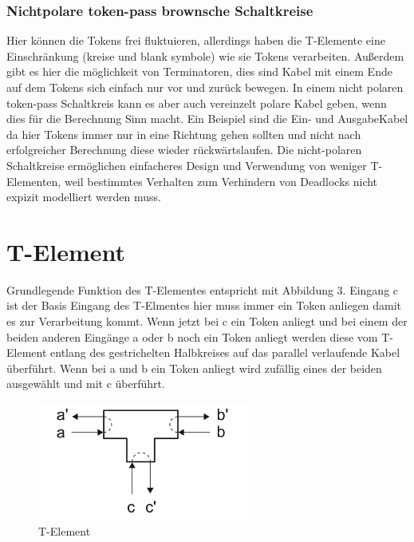 \documentclass[11pt,a4paper]{article}
\begin{document}

\subsubsection{Nichtpolare token-pass brownsche Schaltkreise}
Hier können die Tokens frei fluktuieren, allerdings haben die T-Elemente eine
Einschränkung (kreise und blank symbole) wie sie Tokens verarbeiten.
%
Außerdem gibt es hier die möglichkeit von Terminatoren, dies sind Kabel
mit einem Ende auf dem Tokens sich einfach nur vor und zurück bewegen.
%
In einem nicht polaren token-pass Schaltkreis kann es aber auch vereinzelt
polare Kabel geben, wenn dies für die Berechnung Sinn macht.
%
Ein Beispiel sind die Ein- und AusgabeKabel da hier Tokens immer nur in eine 
Richtung gehen sollten und nicht nach erfolgreicher Berechnung diese 
wieder rückwärtslaufen.
%
Die nicht-polaren Schaltkreise ermöglichen einfacheres Design und Verwendung
von weniger T-Elementen, weil bestimmtes Verhalten zum Verhindern von
Deadlocks nicht expizit modelliert werden muss.



\section{T-Element}
Grundlegende Funktion des T-Elementes entspricht mit Abbildung 3.
%
Eingang c ist der Basis Eingang des T-Elmentes hier muss immer ein Token
anliegen damit es zur Verarbeitung kommt.
%
Wenn jetzt bei c ein Token anliegt und bei einem der beiden anderen
Eingänge a oder b noch ein Token anliegt werden diese vom T-Element 
entlang des gestrichelten Halbkreises auf das parallel verlaufende 
Kabel überführt.
%
Wenn bei a und b ein Token anliegt wird zufällig 
eines der beiden ausgewählt und mit c überführt.

\begin{figure}[h]
    \centering
    \includegraphics[width=7cm]{bilder/T_Element.png}
    \caption{T-Element}
    \label{fig:T_Element}
\end{figure}    
\end{document}

